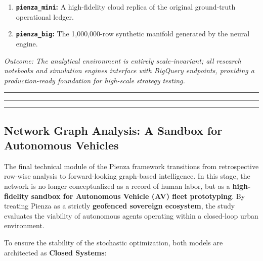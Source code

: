 \begin{enumerate}
    \item \textbf{\texttt{pienza\_mini}:} A high-fidelity cloud replica of the original ground-truth operational ledger.
    \item \textbf{\texttt{pienza\_big}:} The 1,000,000-row synthetic manifold generated by the neural engine.
\end{enumerate}

\noindent \textit{Outcome: The analytical environment is entirely scale-invariant; all research notebooks and simulation engines interface with BigQuery endpoints, providing a production-ready foundation for high-scale strategy testing.}

\vspace{0.4cm}
\rule{\linewidth}{0.4pt}
\vspace{0.4cm}
\rule{\linewidth}{0.4pt}\vspace{0.4cm}
\rule{\linewidth}{0.4pt}


\subsection{Network Graph Analysis: A Sandbox for Autonomous Vehicles}
The final technical module of the Pienza framework transitions from retrospective row-wise analysis to forward-looking graph-based intelligence. In this stage, the network is no longer conceptualized as a record of human labor, but as a \textbf{high-fidelity sandbox for Autonomous Vehicle (AV) fleet prototyping}. By treating Pienza as a strictly \textbf{geofenced sovereign ecosystem}, the study evaluates the viability of autonomous agents operating within a closed-loop urban environment.

To ensure the stability of the stochastic optimization, both models are architected as \textbf{Closed Systems}:


